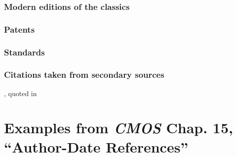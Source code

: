 \documentclass[11pt,letterpaper,oneside]{article}
\begin{document}
\begin{citebib}
\item \cite{epictetus1916}
\end{citebib}

\setcounter{subsubsection}{250}
\subsubsection{Modern editions of the classics}

\begin{citebib}
\item \cite{aristotle1983}
\item \cite{maimonides1965}
\end{citebib}

\setcounter{subsubsection}{257}
\subsubsection{Patents}

\begin{citebib}
\item \cite{iizuka1986}
\end{citebib}

\subsubsection{Standards}

\begin{citebib}
\item \cite[3.2.2]{niso2010}
\item \cite{w3c2008}
\end{citebib}

\setcounter{subsubsection}{259}
\subsubsection{Citations taken from secondary sources}

\begin{citebib}
\item \cite[269]{zukofsky1931}, quoted in \cite[78]{costello1981}
\end{citebib}

\section{Examples from \emph{CMOS} Chap. 15, ``Author-Date
References''}
\label{paren}
\end{document}

